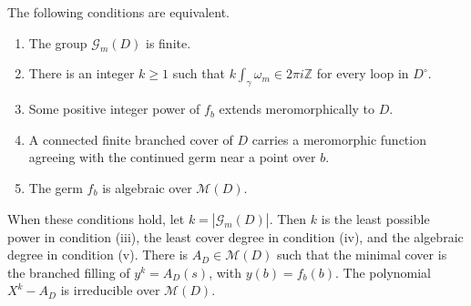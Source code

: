 \begin{theorem}
\label{mono:thm:criterion}
The following conditions are equivalent.
\begin{enumerate}
\item The group \(\mathcal G_m(D)\) is finite.
\item There is an integer \(k\geq1\) such that
\(k\int_\gamma\omega_m\in2\pi i\mathbb Z\) for every loop in \(D^\circ\).
\item Some positive integer power of \(f_b\) extends meromorphically to \(D\).
\item A connected finite branched cover of \(D\) carries a meromorphic
function agreeing with the continued germ near a point over \(b\).
\item The germ \(f_b\) is algebraic over \(\mathcal M(D)\).
\end{enumerate}
When these conditions hold, let \(k=|\mathcal G_m(D)|\).
Then \(k\) is the least possible power in condition (iii), the least
cover degree in condition (iv), and the algebraic degree in condition (v).
There is \(A_D\in\mathcal M(D)\) such that the minimal cover is the
branched filling of \(y^k=A_D(s)\), with \(y(b)=f_b(b)\).
The polynomial \(X^k-A_D\) is irreducible over \(\mathcal M(D)\).
\end{theorem}

